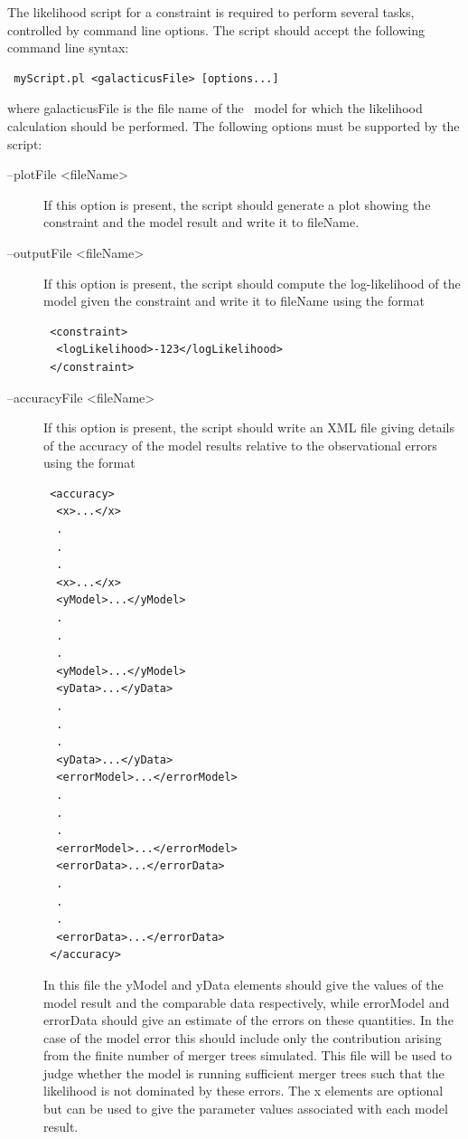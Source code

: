 The likelihood script for a constraint is required to perform several tasks, controlled by command line options. The script should accept the following command line syntax:
\begin{verbatim}
 myScript.pl <galacticusFile> [options...]
\end{verbatim}
where {\normalfont \ttfamily galacticusFile} is the file name of the \glc\ model for which the likelihood calculation should be performed. The following options must be supported by the script:
\begin{description}
 \item [{\normalfont \ttfamily --plotFile <fileName>}] If this option is present, the script should generate a plot showing the constraint and the model result and write it to {\normalfont \ttfamily fileName}.
 \item [{\normalfont \ttfamily --outputFile <fileName>}] If this option is present, the script should compute the log-likelihood of the model given the constraint and write it to {\normalfont \ttfamily fileName} using the format
\begin{verbatim}
 <constraint>
  <logLikelihood>-123</logLikelihood>
 </constraint>
\end{verbatim}
 \item [{\normalfont \ttfamily --accuracyFile <fileName>}] If this option is present, the script should write an XML file giving details of the accuracy of the model results relative to the observational errors using the format
\begin{verbatim}
 <accuracy>
  <x>...</x>
  .
  .
  .
  <x>...</x>
  <yModel>...</yModel>
  .
  .
  .
  <yModel>...</yModel>
  <yData>...</yData>
  .
  .
  .
  <yData>...</yData>
  <errorModel>...</errorModel>
  .
  .
  .
  <errorModel>...</errorModel>
  <errorData>...</errorData>
  .
  .
  .
  <errorData>...</errorData>
 </accuracy>
\end{verbatim}
In this file the {\normalfont \ttfamily yModel} and {\normalfont \ttfamily yData} elements should give the values of the model result and the comparable data respectively, while {\normalfont \ttfamily errorModel} and {\normalfont \ttfamily errorData} should give an estimate of the errors on these quantities. In the case of the model error this should include only the contribution arising from the finite number of merger trees simulated. This file will be used to judge whether the model is running sufficient merger trees such that the likelihood is not dominated by these errors. The {\normalfont \ttfamily x} elements are optional but can be used to give the parameter values associated with each model result.

\end{description}
